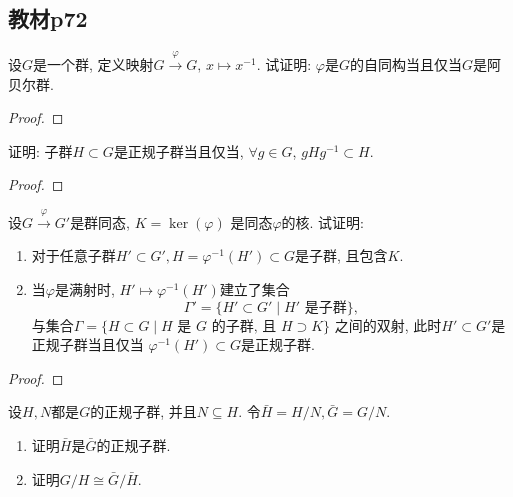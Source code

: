 \subsection{教材p72}

\begin{problem}
    设$G$是一个群, 定义映射$G \xrightarrow\varphi G,\, x \mapsto x^{-1}$.
试证明: $\varphi$是$G$的自同构当且仅当$G$是阿贝尔群.
\end{problem}

\begin{proof}
    
\end{proof}

\begin{problem}
    证明: 子群$H \subset G$是正规子群当且仅当,
$\forall g \in G$, $gHg^{-1} \subset H$.
\end{problem}

\begin{proof}
    
\end{proof}

\begin{problem}
    设$G \xrightarrow\varphi G'$是群同态, $K = \ker(\varphi)$
是同态$\varphi$的核. 试证明: 
\begin{enumerate}[(1)]
    \item 对于任意子群$H' \subset G', H = \varphi^{-1}(H') \subset G$是子群, 且包含$K$.
    \item 当$\varphi$是满射时, $H' \mapsto \varphi^{-1}(H')$建立了集合
\[
    \Gamma'=\{H' \subset G' \mid H' \text{ 是子群}\},
\]
与集合$\Gamma = \{H \subset G \mid H \text{ 是 }G \text{ 的子群, 且 } H \supset K\}$
之间的双射, 此时$H' \subset G'$是正规子群当且仅当
$\varphi^{-1}(H') \subset G$是正规子群.
\end{enumerate}
\end{problem}

\begin{proof}
    
\end{proof}

\begin{problem}
    设$H, N$都是$G$的正规子群, 并且$N \subseteq H$.
令$\bar{H} = H/N, \bar{G} = G/N$.
\begin{enumerate}[(1)]
    \item 证明$\bar{H}$是$\bar{G}$的正规子群.
    \item 证明$G/H \cong \bar{G}/\bar{H}$.
\end{enumerate}
\end{problem}


